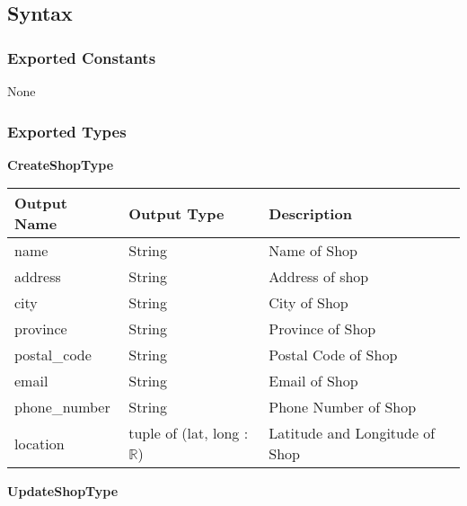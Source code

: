 \documentclass[12pt, titlepage]{article}
\begin{document}
\subsection{Syntax}

\subsubsection{Exported Constants}

None

\subsubsection{Exported Types}

\textbf{CreateShopType}

\begin{table}[H]
	\begin{tabular}{|p{}|p{}|p{}|}
		\hline
		\textbf{Output Name} & \textbf{Output Type}                & \textbf{Description}           \\
		\hline
		name                 & String                              & Name of Shop                   \\
		\hline
		address              & String                              & Address of shop                \\
		\hline
		city                 & String                              & City of Shop                   \\
		\hline
		province             & String                              & Province of Shop               \\
		\hline
		postal\_code         & String                              & Postal Code of Shop            \\
		\hline
		email                & String                              & Email of Shop                  \\
		\hline
		phone\_number        & String                              & Phone Number of Shop           \\
		\hline
		location             & tuple of (lat, long : $\mathbb{R}$) & Latitude and Longitude of Shop \\
		\hline
	\end{tabular}
\end{table}

\textbf{UpdateShopType}
\end{document}
